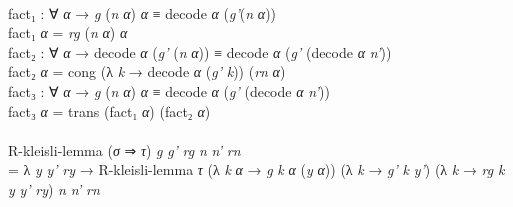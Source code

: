\documentclass{entcs} \usepackage{prentcsmacro}
\newcommand{\AgdaFontStyle}[1]{\textsf{#1}}
\newcommand{\AgdaBoundFontStyle}[1]{\textit{#1}}
\newcommand{\AgdaSymbol}      [1]{\textcolor{AgdaSymbol}{#1}}
\newcommand{\AgdaBound}    [1]{\AgdaBoundFontStyle{\textcolor{AgdaBound}{#1}}}
\newcommand{\AgdaInductiveConstructor}[1]
    {\AgdaFontStyle{\textcolor{AgdaInductiveConstructor}{#1}}}
\newcommand{\AgdaDatatype} [1]{\AgdaFontStyle{\textcolor{AgdaDatatype}{#1}}}
\newcommand{\AgdaFunction} [1]{\AgdaFontStyle{\textcolor{AgdaFunction}{#1}}}
\newcommand{\AgdaIndent}[1]{\quad}
\newcommand{\AgdaCodeStyle}{\small}
\newenvironment{code}%
{\noindent\AgdaCodeStyle\pboxed}%
{\endpboxed\par\noindent%
\ignorespacesafterend}
\begin{document}
\begin{code}
\\
\>[2]\AgdaIndent{4}{}\<[4]%
\>[4]\AgdaFunction{fact₁} \AgdaSymbol{:} \AgdaSymbol{∀} \AgdaBound{α} \AgdaSymbol{→} \AgdaBound{g} \AgdaSymbol{(}\AgdaBound{n} \AgdaBound{α}\AgdaSymbol{)} \AgdaBound{α} \AgdaDatatype{≡} \AgdaFunction{decode} \AgdaBound{α} \AgdaSymbol{(}\AgdaBound{g'}\AgdaSymbol{(}\AgdaBound{n} \AgdaBound{α}\AgdaSymbol{))}\<%
\\
\>[2]\AgdaIndent{4}{}\<[4]%
\>[4]\AgdaFunction{fact₁} \AgdaBound{α} \AgdaSymbol{=} \AgdaBound{rg} \AgdaSymbol{(}\AgdaBound{n} \AgdaBound{α}\AgdaSymbol{)} \AgdaBound{α} \<[25]%
\>[25]\<%
\\
\>[2]\AgdaIndent{4}{}\<[4]%
\>[4]\AgdaFunction{fact₂} \AgdaSymbol{:} \AgdaSymbol{∀} \AgdaBound{α} \AgdaSymbol{→} \AgdaFunction{decode} \AgdaBound{α} \AgdaSymbol{(}\AgdaBound{g'} \AgdaSymbol{(}\AgdaBound{n} \AgdaBound{α}\AgdaSymbol{))} \AgdaDatatype{≡} \AgdaFunction{decode} \AgdaBound{α} \AgdaSymbol{(}\AgdaBound{g'} \AgdaSymbol{(}\AgdaFunction{decode} \AgdaBound{α} \AgdaBound{n'}\AgdaSymbol{))}\<%
\\
\>[2]\AgdaIndent{4}{}\<[4]%
\>[4]\AgdaFunction{fact₂} \AgdaBound{α} \AgdaSymbol{=} \AgdaFunction{cong} \AgdaSymbol{(λ} \AgdaBound{k} \AgdaSymbol{→} \AgdaFunction{decode} \AgdaBound{α} \AgdaSymbol{(}\AgdaBound{g'} \AgdaBound{k}\AgdaSymbol{))} \AgdaSymbol{(}\AgdaBound{rn} \AgdaBound{α}\AgdaSymbol{)}\<%
\\
\>[2]\AgdaIndent{4}{}\<[4]%
\>[4]\AgdaFunction{fact₃} \AgdaSymbol{:} \AgdaSymbol{∀} \AgdaBound{α} \AgdaSymbol{→} \AgdaBound{g} \AgdaSymbol{(}\AgdaBound{n} \AgdaBound{α}\AgdaSymbol{)} \AgdaBound{α} \AgdaDatatype{≡} \AgdaFunction{decode} \AgdaBound{α} \AgdaSymbol{(}\AgdaBound{g'} \AgdaSymbol{(}\AgdaFunction{decode} \AgdaBound{α} \AgdaBound{n'}\AgdaSymbol{))}\<%
\\
\>[2]\AgdaIndent{4}{}\<[4]%
\>[4]\AgdaFunction{fact₃} \AgdaBound{α} \AgdaSymbol{=} \AgdaFunction{trans} \AgdaSymbol{(}\AgdaFunction{fact₁} \AgdaBound{α}\AgdaSymbol{)} \AgdaSymbol{(}\AgdaFunction{fact₂} \AgdaBound{α}\AgdaSymbol{)}\<%
\\
%
\\
\>\AgdaFunction{R-kleisli-lemma} \AgdaSymbol{(}\AgdaBound{σ} \AgdaInductiveConstructor{⇒} \AgdaBound{τ}\AgdaSymbol{)} \AgdaBound{g} \AgdaBound{g'} \AgdaBound{rg} \AgdaBound{n} \AgdaBound{n'} \AgdaBound{rn} \<[40]%
\>[40]\<%
\\
\>[0]\AgdaIndent{2}{}\<[2]%
\>[2]\AgdaSymbol{=} \AgdaSymbol{λ} \AgdaBound{y} \AgdaBound{y'} \AgdaBound{ry} \AgdaSymbol{→} \AgdaFunction{R-kleisli-lemma} \AgdaBound{τ} \AgdaSymbol{(λ} \AgdaBound{k} \AgdaBound{α} \AgdaSymbol{→} \AgdaBound{g} \AgdaBound{k} \AgdaBound{α} \AgdaSymbol{(}\AgdaBound{y} \AgdaBound{α}\AgdaSymbol{))} \AgdaSymbol{(λ} \AgdaBound{k} \AgdaSymbol{→} \AgdaBound{g'} \AgdaBound{k} \AgdaBound{y'}\AgdaSymbol{)} \AgdaSymbol{(λ} \AgdaBound{k} \AgdaSymbol{→} \AgdaBound{rg} \AgdaBound{k} \AgdaBound{y} \AgdaBound{y'} \AgdaBound{ry}\AgdaSymbol{)} \AgdaBound{n} \AgdaBound{n'} \AgdaBound{rn} \<[101]%
\>[101]\<%
\\
\>\<\end{code}
\end{document}
